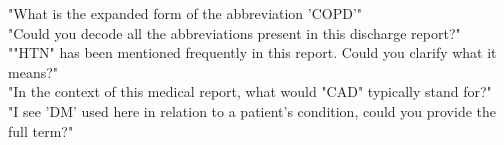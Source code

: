 "What is the expanded form of the abbreviation 'COPD'"\\
"Could you decode all the abbreviations present in this discharge report?"\\
""HTN" has been mentioned frequently in this report. Could you clarify what it means?"\\
"In the context of this medical report, what would "CAD" typically stand for?"\\
"I see 'DM' used here in relation to a patient's condition, could you provide the full term?"